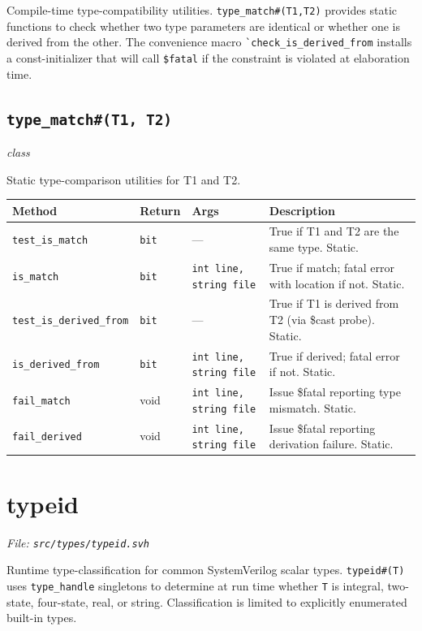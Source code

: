\documentclass[11pt,letterpaper]{report}
\begin{document}
Compile-time type-compatibility utilities. \texttt{type\_match\#(T1,T2)} provides static functions to check whether two type parameters are identical or whether one is derived from the other. The convenience macro \texttt{\`{}check\_is\_derived\_from} installs a const-initializer that will call \texttt{\$fatal} if the constraint is violated at elaboration time.

\subsection*{\texttt{type\_match\#(T1, T2)}}
\noindent\small\textit{class}\par

Static type-comparison utilities for T1 and T2.

\begin{xltabular}{\linewidth}{>{\small}p{1.35in} >{\small}p{1.25in} >{\small}p{0.95in} >{\small}X}
\toprule
\textbf{Method} & \textbf{Return} & \textbf{Args} & \textbf{Description} \\
\midrule
\endhead
\bottomrule
\endfoot
\texttt{test\_is\_match} & \texttt{bit} & --- & True if T1 and T2 are the same type. Static. \\
\texttt{is\_match} & \texttt{bit} & \texttt{int line, string file} & True if match; fatal error with location if not. Static. \\
\texttt{test\_is\_derived\_from} & \texttt{bit} & --- & True if T1 is derived from T2 (via \$cast probe). Static. \\
\texttt{is\_derived\_from} & \texttt{bit} & \texttt{int line, string file} & True if derived; fatal error if not. Static. \\
\texttt{fail\_match} & void & \texttt{int line, string file} & Issue \$fatal reporting type mismatch. Static. \\
\texttt{fail\_derived} & void & \texttt{int line, string file} & Issue \$fatal reporting derivation failure. Static. \\
\end{xltabular}

\section{typeid}
\noindent\small\textit{File: \texttt{src/types/typeid.svh}}\par

Runtime type-classification for common SystemVerilog scalar types. \texttt{typeid\#(T)} uses \texttt{type\_handle} singletons to determine at run time whether \texttt{T} is integral, two-state, four-state, real, or string. Classification is limited to explicitly enumerated built-in types.
\end{document}
